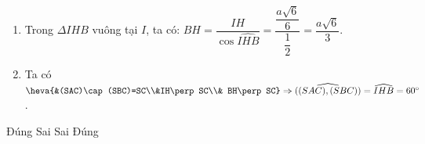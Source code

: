 \begin{ex}
{\begin{enumerate}
   Ta có $IH$ là đường  trung bình trong $\Delta AKC$ nên $IH=\dfrac{AK}{2}=\dfrac{a\sqrt{6}}{6}$.\\
   Vì $BI$ là đường trung tuyến trong tam  giác vuông $\Delta ABC$ nên $BI=\dfrac{AC}{2}=\dfrac{a\sqrt{2}}{2}$.\\
   Theo chứng minh trên $BI \perp (SAC)\Rightarrow BI \perp  HI$ hay $\Delta IHB$ vuông tại $I$.\\
   Góc giữa hai đường thẳng $IH$ và $BH$ bằng $\widehat{IHB}$. Trong $\Delta  IHB$, có
   \begin{center}
    $\tan\widehat{IHB}=\dfrac{IB}{IH}=\dfrac{\dfrac{a\sqrt{2}}{2}}{\dfrac{a\sqrt{6}}{6}}=\sqrt{3} \Rightarrow \widehat{IHB}=60^\circ$. 
   \end{center}
   Do đó $\cos \widehat{IHB}=\dfrac{1}{2}$. Vậy cosin của góc tạo bởi hai đường thẳng $IH$ và $BH$ bằng  $\dfrac{1}{2}$.
    \item Trong $\Delta IHB$ vuông tại $I$, ta có: $BH=\dfrac{IH}{\cos \widehat{IHB}}=\dfrac{\dfrac{a\sqrt{6}}{6}}{\dfrac{1}{2}}=\dfrac{a\sqrt{6}}{3}$.
   \item Ta có $\heva{&(SAC)\cap (SBC)=SC\\&IH\perp SC\\& BH\perp SC}\Rightarrow  \widehat{((SAC),(SBC))}= \widehat{IHB}=60^\circ$.
  \end{enumerate}
  \begin{itemchoice}
   \itemch  Đúng
   \itemch Sai 
   \itemch  Sai
   \itemch  Đúng
  \end{itemchoice}
 } 
\end{ex}


